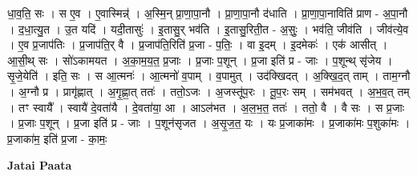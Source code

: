 \documentclass[17pt]{extarticle}
\begin{document}
धा॒व॒ति॒ सः । स ए॒व । ए॒वास्मिन्न्॑ । अ॒स्मि॒न् प्रा॒णा॒पा॒नौ । प्रा॒णा॒पा॒नौ द॑धाति । प्रा॒णा॒पा॒नाविति॑ प्राण - अ॒पा॒नौ । द॒धा॒त्यु॒त । उ॒त यदि॑ । यदी॒तासुः॑ । इ॒तासु॒र् भव॑ति । इ॒तासु॒रिती॒त - अ॒सुः॒ । भव॑ति॒ जीव॑ति । जीव॑त्ये॒व । ए॒व प्र॒जाप॑तिः । प्र॒जाप॑ति॒र् वै । प्र॒जाप॑ति॒रिति॑ प्र॒जा - प॒तिः॒ । वा इ॒दम् । इ॒दमेकः॑ । एक॑ आसीत् । आ॒सी॒थ् सः । सो॑ऽकामयत । अ॒का॒म॒य॒त॒ प्र॒जाः । प्र॒जाः प॒शून् । प्र॒जा इति॑ प्र - जाः । प॒शून्थ् सृ॑जेय । सृ॒जे॒येति॑ । इति॒ सः । स आ॒त्मनः॑ । आ॒त्मनो॑ व॒पाम् । व॒पामुत् । उद॑क्खिदत् । अ॒क्खि॒द॒त् ताम् । ताम॒ग्नौ । अ॒ग्नौ प्र । प्रागृ॑ह्णात् । अ॒गृ॒ह्णा॒त् ततः॑ । ततो॒ऽजः । अ॒जस्तू॑प॒रः । तू॒प॒रः सम् । सम॑भवत् । अ॒भ॒व॒त् तम् । तꣳ स्वायै᳚ । स्वायै॑ दे॒वता॑यै । दे॒वता॑या॒ आ । आऽल॑भत । अ॒ल॒भ॒त॒ ततः॑ । ततो॒ वै । वै सः । स प्र॒जाः । प्र॒जाः प॒शून् । प्र॒जा इति॑ प्र - जाः । प॒शून॑सृजत । अ॒सृ॒ज॒त॒ यः । यः प्र॒जाका॑मः । प्र॒जाका॑मः  प॒शुका॑मः । प्र॒जाका॑म॒ इति॑ प्र॒जा - का॒मः॒ \newline

\textbf{Jatai Paata} \newline
\end{document}
